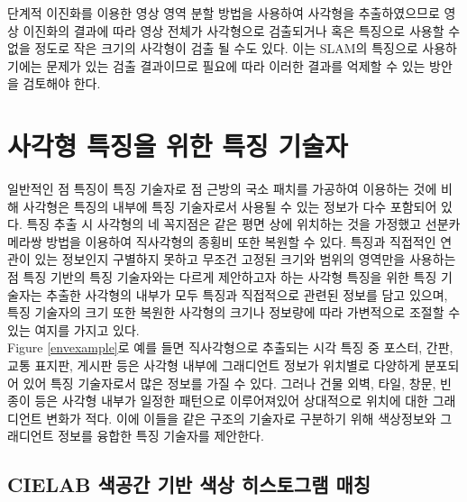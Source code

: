 \documentclass[master,korean,final]{cbnu-ecs}
\begin{document}
단계적 이진화를 이용한 영상 영역 분할 방법을 사용하여 사각형을 추출하였으므로 영상 이진화의 결과에 따라 영상 전체가 사각형으로 검출되거나 혹은 특징으로 사용할 수 없을 정도로 작은 크기의 사각형이 검출 될 수도 있다. 이는 SLAM의 특징으로 사용하기에는 문제가 있는 검출 결과이므로 필요에 따라 이러한 결과를 억제할 수 있는 방안을 검토해야 한다.
\chapter{사각형 특징을 위한 특징 기술자}
일반적인 점 특징이 특징 기술자로 점 근방의 국소 패치를 가공하여 이용하는 것에 비해 사각형은 특징의 내부에 특징 기술자로서 사용될 수 있는 정보가 다수 포함되어 있다. 특징 추출 시 사각형의 네 꼭지점은 같은 평면 상에 위치하는 것을 가정했고 선분카메라쌍 방법을 이용하여 직사각형의 종횡비 또한 복원할 수 있다. 특징과 직접적인 연관이 있는 정보인지 구별하지 못하고 무조건 고정된 크기와 범위의 영역만을 사용하는 점 특징 기반의 특징 기술자와는 다르게 제안하고자 하는 사각형 특징을 위한 특징 기술자는 추출한 사각형의 내부가 모두 특징과 직접적으로 관련된 정보를 담고 있으며, 특징 기술자의 크기 또한 복원한 사각형의 크기나 정보량에 따라 가변적으로 조절할 수 있는 여지를 가지고 있다. \\
Figure \ref{envexample}로 예를 들면 직사각형으로 추출되는 시각 특징 중 포스터, 간판, 교통 표지판, 게시판 등은 사각형 내부에 그래디언트 정보가 위치별로 다양하게 분포되어 있어 특징 기술자로서 많은 정보를 가질 수 있다. 그러나 건물 외벽, 타일, 창문, 빈 종이 등은 사각형 내부가 일정한 패턴으로 이루어져있어 상대적으로 위치에 대한 그래디언트 변화가 적다. 이에 이들을 같은 구조의 기술자로 구분하기 위해 색상정보와 그래디언트 정보를 융합한 특징 기술자를 제안한다.\\
\section{CIELAB 색공간 기반 색상 히스토그램 매칭}
\end{document}
